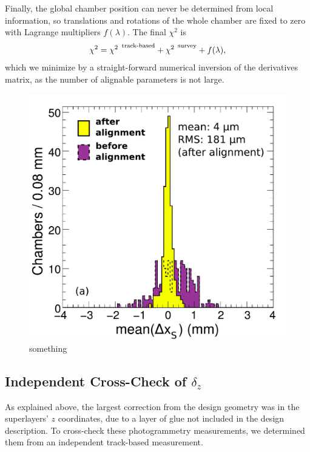Finally, the global chamber position can never be determined from
local information, so translations and rotations of the whole chamber
are fixed to zero with Lagrange multipliers $f(\lambda)$.  The final
$\chi^2$ is
\begin{equation}
\chi^2 = {\chi^2}^{\mbox{\scriptsize \, track-based}} +
{\chi^2}^{\mbox{\scriptsize \, survey}} + f(\lambda) \mbox{,}
\end{equation}
which we minimize by a straight-forward numerical inversion of the
derivatives matrix, as the number of alignable parameters is not
large.

\begin{figure}
\centering
\includegraphics[width=0.5\linewidth]{plots/standalone_dt_alignment/residualsStandaloneAlignment.pdf}
\caption{something \label{fig:residualsStandaloneAlignment}}
\end{figure}

\subsection{Independent Cross-Check of $\delta_z$}
\label{sec:standdt_independent}

As explained above, the largest correction from the design geometry
was in the superlayers' $z$ coordinates, due to a layer of glue not
included in the design description.  To cross-check these
photogrammetry measurements, we determined them from an independent
track-based measurement.

